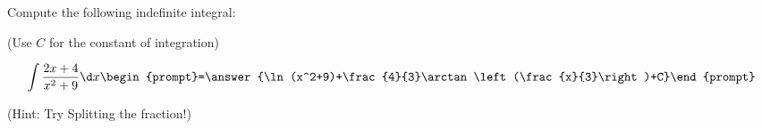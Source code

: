\documentclass{ximera}
\author{Jim Talamo}
\begin{document}
\begin{exercise}
Compute the following indefinite integral:

\begin{prompt} (Use $C$ for the constant of integration) \end{prompt}

\[
\int \frac{2x+4}{x^2+9} \d x 
\begin{prompt}=\answer{\ln(x^2+9)+\frac{4}{3}\arctan\left(\frac{x}{3}\right)+C}\end{prompt}
\]

(Hint: Try Splitting the fraction!)

\end{exercise}
\end{document}
